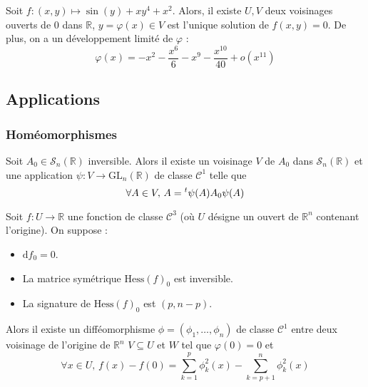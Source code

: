 
  \begin{example}
    Soit $f : (x,y) \mapsto \sin(y) + xy^4 + x^2$. Alors, il existe $U, V$ deux voisinages ouverts de $0$ dans $\mathbb{R}$, $y = \varphi(x) \in V$ est l'unique solution de $f(x,y) = 0$. De plus, on a un développement limité de $\varphi$ :
    \[ \varphi(x) = -x^2 - \frac{x^6}{6} - x^9 - \frac{x^{10}}{40} + o(x^{11}) \]
  \end{example}

  \subsection{Applications}

  \subsubsection{Homéomorphismes}


  \begin{lemma}
    Soit $A_0 \in \mathcal{S}_n(\mathbb{R})$ inversible. Alors il existe un voisinage $V$ de $A_0$ dans $\mathcal{S}_n(\mathbb{R})$ et une application $\psi : V \rightarrow \mathrm{GL}_n(\mathbb{R})$ de classe $\mathcal{C}^1$ telle que
    \[ \forall A \in V, \, A = \mathstrut ^t \psi(A) A_0 \psi(A) \]
  \end{lemma}


  \begin{lemma}[Morse]
    Soit $f : U \rightarrow \mathbb{R}$ une fonction de classe $\mathcal{C}^3$ (où $U$ désigne un ouvert de $\mathbb{R}^n$ contenant l'origine). On suppose :
    \begin{itemize}
      \item $\mathrm{d} f_0 = 0$.
      \item La matrice symétrique $\mathrm{Hess} (f)_0$ est inversible.
      \item La signature de $\mathrm{Hess}(f)_0$ est $(p, n-p)$.
    \end{itemize}
    Alors il existe un difféomorphisme $\phi = (\phi_1, \dots, \phi_n)$ de classe $\mathcal{C}^1$ entre deux voisinage de l'origine de $\mathbb{R}^n$ $V \subseteq U$ et $W$ tel que $\varphi(0) = 0$ et
    \[ \forall x \in U, \, f(x) - f(0) = \sum_{k=1}^p \phi_k^2(x) - \sum_{k=p+1}^n \phi_k^2(x) \]
  \end{lemma}

